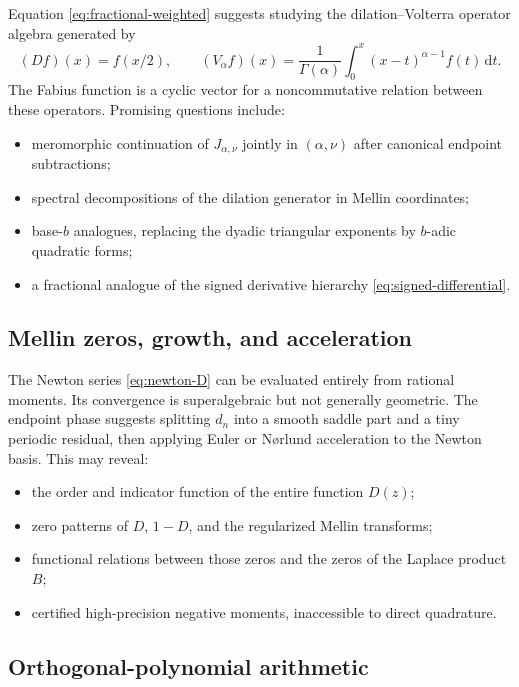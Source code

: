\documentclass[11pt,oneside]{article}
\theoremstyle{definition}
\theoremstyle{remark}
\newcommand{\dd}{\,\mathrm d}
\begin{document}
Equation \eqref{eq:fractional-weighted} suggests studying the dilation--Volterra operator algebra generated by
\[
 (Df)(x)=f(x/2),
 \qquad
 (V_\alpha f)(x)=\frac1{\Gamma(\alpha)}
 \int_0^x(x-t)^{\alpha-1}f(t)\dd t.
\]
The Fabius function is a cyclic vector for a noncommutative relation between these operators.  Promising questions include:
\begin{itemize}
\item meromorphic continuation of $J_{\alpha,\nu}$ jointly in $(\alpha,\nu)$ after canonical endpoint subtractions;
\item spectral decompositions of the dilation generator in Mellin coordinates;
\item base-$b$ analogues, replacing the dyadic triangular exponents by $b$-adic quadratic forms;
\item a fractional analogue of the signed derivative hierarchy \eqref{eq:signed-differential}.
\end{itemize}

\subsection{Mellin zeros, growth, and acceleration}

The Newton series \eqref{eq:newton-D} can be evaluated entirely from rational moments.  Its convergence is superalgebraic but not generally geometric.  The endpoint phase suggests splitting $d_n$ into a smooth saddle part and a tiny periodic residual, then applying Euler or N\o rlund acceleration to the Newton basis.  This may reveal:
\begin{itemize}
\item the order and indicator function of the entire function $D(z)$;
\item zero patterns of $D$, $1-D$, and the regularized Mellin transforms;
\item functional relations between those zeros and the zeros of the Laplace product $B$;
\item certified high-precision negative moments, inaccessible to direct quadrature.
\end{itemize}

\subsection{Orthogonal-polynomial arithmetic}
\end{document}
